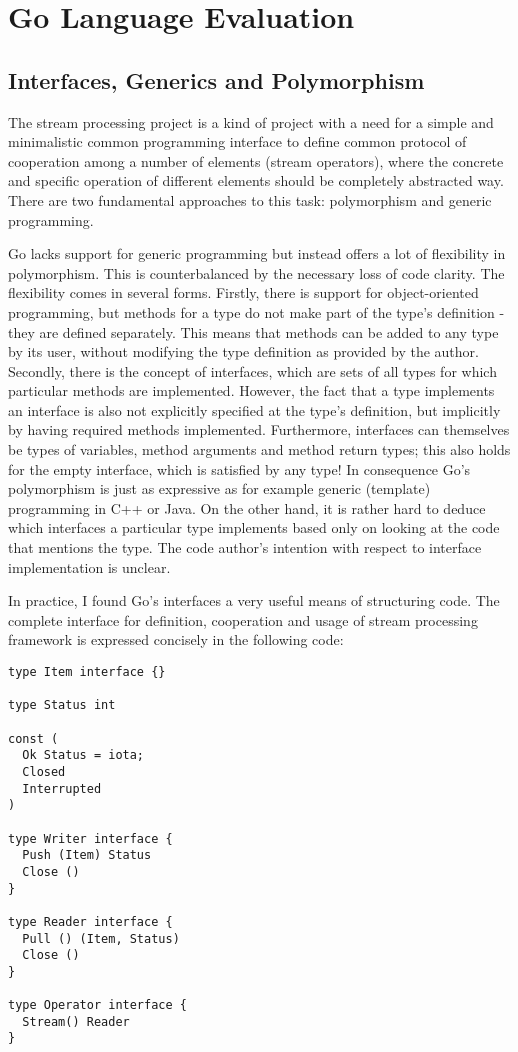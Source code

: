 \documentclass {article}
\begin{document}
\section{Go Language Evaluation}
\label{sec:language}

\subsection {Interfaces, Generics and Polymorphism}

The stream processing project is a kind of project with a need for a simple and
minimalistic common programming interface to define common protocol of
cooperation among a number of elements (stream operators), where the concrete
and specific operation of different elements should be completely abstracted
way. There are two fundamental approaches to this task: polymorphism and generic
programming.

Go lacks support for generic programming but instead offers a lot of flexibility
in polymorphism. This is counterbalanced by the necessary loss of code clarity.
The flexibility comes in several forms. Firstly, there is support for
object-oriented programming, but methods for a type do not make part of the
type's definition - they are defined separately. This means that methods can be
added to any type by its user, without modifying the type definition as provided
by the author. Secondly, there is the concept of interfaces, which are sets of
all types for which particular methods are implemented. However, the fact that a
type implements an interface is also not explicitly specified at the type's
definition, but implicitly by having required methods implemented. Furthermore,
interfaces can themselves be types of variables, method arguments and method
return types; this also holds for the empty interface, which is satisfied by any
type! In consequence Go's polymorphism is just as expressive as for example
generic (template) programming in C++ or Java. On the other hand, it is rather
hard to deduce which interfaces a particular type implements based only on
looking at the code that mentions the type. The code author's intention with
respect to interface implementation is unclear.

In practice, I found Go's interfaces a very useful means of structuring code.
The complete interface for definition, cooperation and usage of stream
processing framework is expressed concisely in the following code:

\begin{lstlisting}
type Item interface {}

type Status int

const (
  Ok Status = iota;
  Closed
  Interrupted
)

type Writer interface {
  Push (Item) Status
  Close ()
}

type Reader interface {
  Pull () (Item, Status)
  Close ()
}

type Operator interface {
  Stream() Reader
}
\end{lstlisting}
\end{document}
